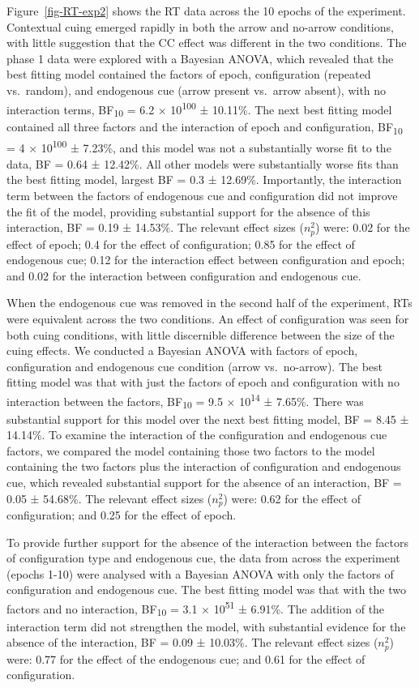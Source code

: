 \documentclass[
  man,
  floatsintext,
  longtable,
  nolmodern,
  notxfonts,
  notimes,
  colorlinks=true,linkcolor=blue,citecolor=blue,urlcolor=blue]{apa7}
\begin{document}
Figure~\ref{fig-RT-exp2} shows the RT data across the 10 epochs of the
experiment. Contextual cuing emerged rapidly in both the arrow and
no-arrow conditions, with little suggestion that the CC effect was
different in the two conditions. The phase 1 data were explored with a
Bayesian ANOVA, which revealed that the best fitting model contained the
factors of epoch, configuration (repeated vs.~random), and endogenous
cue (arrow present vs.~arrow absent), with no interaction terms,
BF\textsubscript{10} = 6.2 × 10\textsuperscript{100} ± 10.11\%. The next
best fitting model contained all three factors and the interaction of
epoch and configuration, BF\textsubscript{10} = 4 ×
10\textsuperscript{100} ± 7.23\%, and this model was not a substantially
worse fit to the data, BF = 0.64 ± 12.42\%. All other models were
substantially worse fits than the best fitting model, largest BF = 0.3 ±
12.69\%. Importantly, the interaction term between the factors of
endogenous cue and configuration did not improve the fit of the model,
providing substantial support for the absence of this interaction, BF =
0.19 ± 14.53\%. The relevant effect sizes (\(n^2_p\)) were: 0.02 for the
effect of epoch; 0.4 for the effect of configuration; 0.85 for the
effect of endogenous cue; 0.12 for the interaction effect between
configuration and epoch; and 0.02 for the interaction between
configuration and endogenous cue.

When the endogenous cue was removed in the second half of the
experiment, RTs were equivalent across the two conditions. An effect of
configuration was seen for both cuing conditions, with little
discernible difference between the size of the cuing effects. We
conducted a Bayesian ANOVA with factors of epoch, configuration and
endogenous cue condition (arrow vs.~no-arrow). The best fitting model
was that with just the factors of epoch and configuration with no
interaction between the factors, BF\textsubscript{10} = 9.5 ×
10\textsuperscript{14} ± 7.65\%. There was substantial support for this
model over the next best fitting model, BF = 8.45 ± 14.14\%. To examine
the interaction of the configuration and endogenous cue factors, we
compared the model containing those two factors to the model containing
the two factors plus the interaction of configuration and endogenous
cue, which revealed substantial support for the absence of an
interaction, BF = 0.05 ± 54.68\%. The relevant effect sizes (\(n^2_p\))
were: 0.62 for the effect of configuration; and 0.25 for the effect of
epoch.

To provide further support for the absence of the interaction between
the factors of configuration type and endogenous cue, the data from
across the experiment (epochs 1-10) were analysed with a Bayesian ANOVA
with only the factors of configuration and endogenous cue. The best
fitting model was that with the two factors and no interaction,
BF\textsubscript{10} = 3.1 × 10\textsuperscript{51} ± 6.91\%. The
addition of the interaction term did not strengthen the model, with
substantial evidence for the absence of the interaction, BF = 0.09 ±
10.03\%. The relevant effect sizes (\(n^2_p\)) were: 0.77 for the effect
of the endogenous cue; and 0.61 for the effect of configuration.
\end{document}

